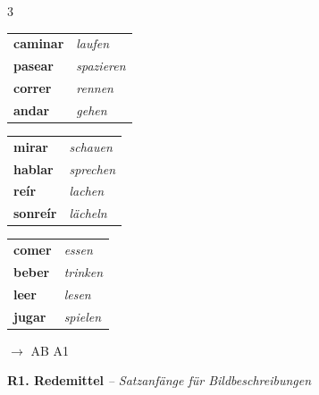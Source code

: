\documentclass[10pt, a4paper]{article}
\newcommand{\seriftext}[1]{{\fontfamily{ppl}\selectfont #1}}
\newcommand{\es}[1]{\seriftext{\textbf{#1}}}
\newcommand{\de}[1]{\textit{\textcolor{akzent}{#1}}}
\newcommand{\abmark}[1]{{\footnotesize\textcolor{akzent}{$\rightarrow$ AB #1}}}
\newcommand{\abschnitt}[2]{\noindent\textbf{\large #1. #2}}
\begin{document}
\begin{merkbox}
{\small
\begin{multicols}{3}
\begin{tabular}{@{}ll@{}}
\es{caminar} & \de{laufen} \\
\es{pasear} & \de{spazieren} \\
\es{correr} & \de{rennen} \\
\es{andar} & \de{gehen} \\
\end{tabular}

\columnbreak

\begin{tabular}{@{}ll@{}}
\es{mirar} & \de{schauen} \\
\es{hablar} & \de{sprechen} \\
\es{reír} & \de{lachen} \\
\es{sonreír} & \de{lächeln} \\
\end{tabular}

\columnbreak

\begin{tabular}{@{}ll@{}}
\es{comer} & \de{essen} \\
\es{beber} & \de{trinken} \\
\es{leer} & \de{lesen} \\
\es{jugar} & \de{spielen} \\
\end{tabular}
\end{multicols}}
\end{merkbox}

\abmark{A1}

\vspace{6pt}

\abschnitt{R1}{Redemittel} \de{-- Satzanfänge für Bildbeschreibungen}

\vspace{3pt}
\end{document}
